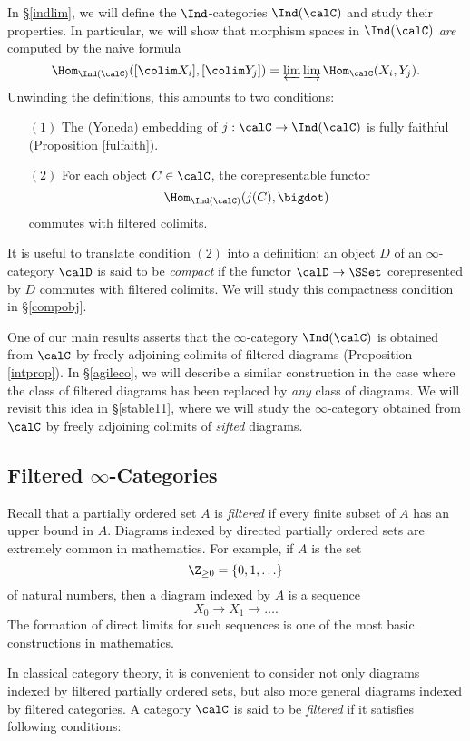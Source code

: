 In \S \ref{indlim}, we will define the $\Ind$-categories $\Ind(\calC)$ and study their properties. In particular, we will show that morphism spaces in $\Ind(\calC)$ {\em are} computed by the naive formula
$$ \Hom_{\Ind(\calC)}( [\colim X_i], [\colim Y_j]) =
\varprojlim \varinjlim \Hom_{\calC}(X_i, Y_j).$$
Unwinding the definitions, this amounts to two conditions:
\begin{itemize}
\item[$(1)$] The (Yoneda) embedding of $j: \calC \rightarrow \Ind(\calC)$ is fully faithful (Proposition \ref{fulfaith}).
\item[$(2)$] For each object $C \in \calC$, the corepresentable functor
$$ \Hom_{\Ind(\calC)}( j(C), \bigdot) $$ commutes with filtered colimits.
\end{itemize}
It is useful to translate condition $(2)$ into a definition: an object $D$ of an $\infty$-category
$\calD$ is said to be {\it compact} if the functor $\calD \rightarrow \SSet$ corepresented by $D$ commutes with filtered colimits. We will study this compactness condition in \S \ref{compobj}.

One of our main results asserts that the $\infty$-category $\Ind(\calC)$ is obtained from $\calC$ by freely adjoining colimits of filtered diagrams (Proposition \ref{intprop}). In \S \ref{agileco}, we will describe a similar construction in the case where the class of filtered diagrams has been replaced by {\em any} class of diagrams. We will revisit this idea in \S \ref{stable11}, where we will study the $\infty$-category obtained from $\calC$ by freely adjoining colimits of {\em sifted} diagrams.

\subsection{Filtered $\infty$-Categories}\label{smallfilt}

Recall that a partially ordered
set $A$ is {\it filtered} if every finite subset of $A$ has an
upper bound in $A$. Diagrams indexed by directed partially ordered sets are extremely common in mathematics. For example, if $A$ is the set $$\Z_{\geq 0} = \{0, 1, \ldots \}$$ of natural
numbers, then a diagram indexed by $A$ is a sequence
$$ X_0 \rightarrow X_1 \rightarrow \ldots .$$
The formation of direct limits for such sequences is one of the most basic constructions in mathematics.

In classical category theory, it is convenient to consider not
only diagrams indexed by filtered partially ordered sets, but also
more general diagrams indexed by filtered categories. A category
$\calC$ is said to be {\it filtered} if it satisfies following
conditions:

